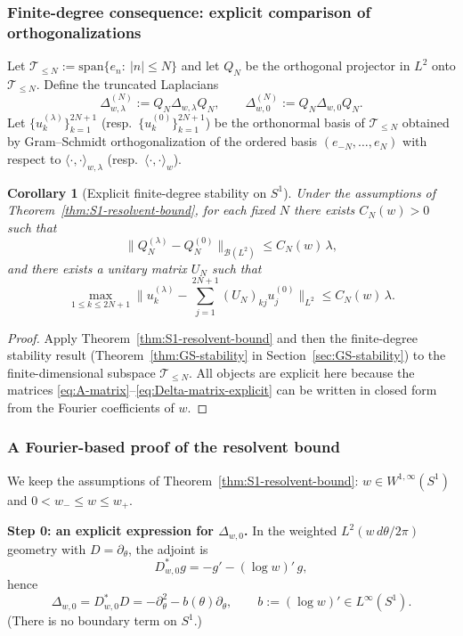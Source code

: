 \documentclass{amsart}
\numberwithin{equation}{section}
\newtheorem{corollary}[theorem]{Corollary}
\theoremstyle{definition}
\theoremstyle{remark}
\begin{document}
\subsubsection{Finite-degree consequence: explicit comparison of orthogonalizations}

Let $\mathcal T_{\le N}:=\mathrm{span}\{e_n:\ |n|\le N\}$ and let $Q_N$ be the orthogonal projector in $L^2$
onto $\mathcal T_{\le N}$.
Define the truncated Laplacians
\[
\Delta_{w,\lambda}^{(N)}:=Q_N\Delta_{w,\lambda}Q_N,
\qquad
\Delta_{w,0}^{(N)}:=Q_N\Delta_{w,0}Q_N.
\]
Let $\{u_k^{(\lambda)}\}_{k=1}^{2N+1}$ (resp.\ $\{u_k^{(0)}\}_{k=1}^{2N+1}$) be the orthonormal basis
of $\mathcal T_{\le N}$ obtained by Gram--Schmidt orthogonalization of the ordered basis
$(e_{-N},\dots,e_N)$ with respect to $\langle\cdot,\cdot \rangle_{w,\lambda}$ (resp.\ $\langle\cdot,\cdot \rangle_w$).

\begin{corollary}[Explicit finite-degree stability on $S^1$]\label{cor:S1-finite-degree}
Under the assumptions of Theorem~\ref{thm:S1-resolvent-bound}, for each fixed $N$ there exists
$C_N(w)>0$ such that
\[
\|Q_N^{(\lambda)}-Q_N^{(0)}\|_{\mathcal B(L^2)} \le C_N(w)\,\lambda,
\]
and there exists a unitary matrix $U_N$ such that
\[
\max_{1\le k\le 2N+1}\Big\|u_k^{(\lambda)}-\sum_{j=1}^{2N+1}(U_N)_{kj}u_j^{(0)}\Big\|_{L^2}
\le C_N(w)\,\lambda.
\]
\end{corollary}

\begin{proof}
Apply Theorem~\ref{thm:S1-resolvent-bound} and then the finite-degree stability result
(Theorem~\ref{thm:GS-stability} in Section~\ref{sec:GS-stability}) to the finite-dimensional
subspace $\mathcal T_{\le N}$.
All objects are explicit here because the matrices \eqref{eq:A-matrix}--\eqref{eq:Delta-matrix-explicit}
can be written in closed form from the Fourier coefficients of $w$.
\end{proof}

\subsubsection{A Fourier-based proof of the resolvent bound}
\label{subsubsec:S1-fourier-proof}

We keep the assumptions of Theorem~\ref{thm:S1-resolvent-bound}:
$w\in W^{1,\infty}(S^1)$ and $0<w_-\le w\le w_+$.

\medskip
\noindent\textbf{Step 0: an explicit expression for $\Delta_{w,0}$.}
In the weighted $L^2(w\,d\theta/2\pi)$ geometry with $D=\partial_\theta$,
the adjoint is
\[
D^*_{w,0} g = -g' - (\log w)'\,g,
\]
hence
\begin{equation}\label{eq:Delta-w0-circle}
\Delta_{w,0}=D^*_{w,0}D
= -\partial_\theta^2 - b(\theta)\partial_\theta,
\qquad b:=(\log w)'\in L^\infty(S^1).
\end{equation}
(There is no boundary term on $S^1$.)
\end{document}
